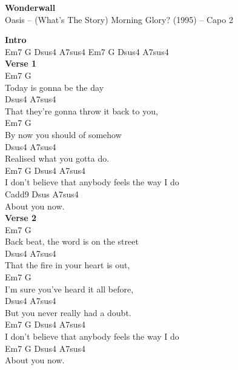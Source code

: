 \documentclass[a4paper]{article}
\begin{document}
    \begin{center}
        \textbf{Wonderwall}
        ~\\
        Oasis -- (What's The Story) Morning Glory? (1995)
         -- Capo 2
    \end{center}
    {
        \scriptsize
        \textbf{Intro}
        ~\\
        {
            \cutive
            \obeyspaces
Em7 G   Dsus4   A7sus4   Em7 G   Dsus4   A7sus4  
\\

        }
        \textbf{Verse 1}
        ~\\
        {
            \cutive
            \obeyspaces
Em7      G
\\
Today is gonna be the day
\\
             Dsus4                  A7sus4
\\
That they're gonna throw it back to you,
\\
Em7        G
\\
By now you should of somehow
\\
   Dsus4                A7sus4
\\
Realised what you gotta do.
\\
Em7                  G       Dsus4           A7sus4
\\
I don't believe that anybody feels the way I do
\\
          Cadd9 Dsus   A7sus4 
\\
About you now.
\\

        }
        \textbf{Verse 2}
        ~\\
        {
            \cutive
            \obeyspaces
Em7            G
\\
Back beat, the word is on the street
\\
         Dsus4                 A7sus4
\\
That the fire in your heart is out,
\\
Em7             G
\\
I'm sure you've heard it all before,
\\
        Dsus4              A7sus4
\\
But you never really had a doubt.
\\
Em7                  G       Dsus4           A7sus4
\\
I don't believe that anybody feels the way I do
\\
          Em7 G   Dsus4 A7sus4 
\\
About you now.
\\

}}
\end{document}
